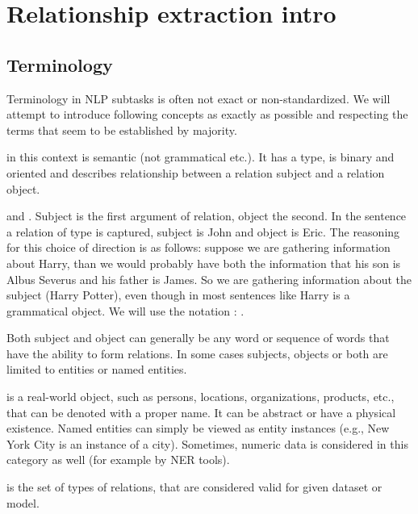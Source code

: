 \chapter{Relationship extraction intro} 

\section{Terminology}
Terminology in NLP subtasks is often not exact or non-standardized. We will attempt to introduce following concepts as exactly as possible and respecting the terms that seem to be established by majority.  

 in this context is semantic (not grammatical etc.). It has a type, is binary and oriented and describes relationship between a relation subject and a relation object.

 and . Subject is the first argument of relation, object the second. In the sentence  a relation of type is captured, subject is John and object is Eric. The reasoning for this choice of direction is as follows: suppose we are gathering information about Harry, than we would probably have both the information that his son is Albus Severus and his father is James. So we are gathering information about the subject (Harry Potter), even though in most sentences like   Harry is a grammatical object. We will use the notation : . 

Both subject and object can generally be any word or sequence of words that have the ability to form relations. In some cases subjects, objects or both are limited to entities or named entities. 

   is a real-world object, such as persons, locations, organizations, products, etc., that can be denoted with a proper name. It can be abstract or have a physical existence. Named entities can simply be viewed as entity instances (e.g., New York City is an instance of a city). Sometimes, numeric data is considered in this category as well (for example by NER tools).  

 is the set of types of relations, that are considered valid for given dataset or model.

